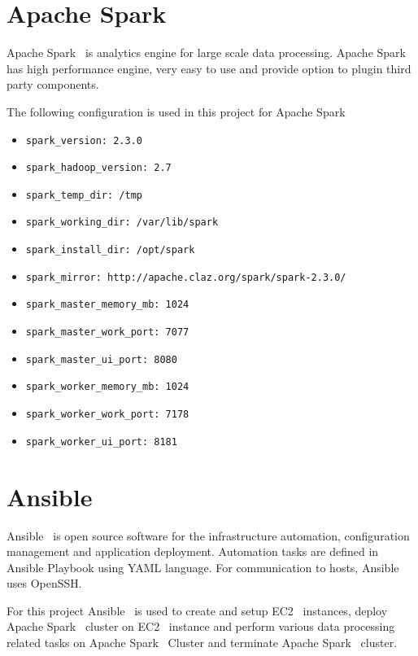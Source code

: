 \section{Apache Spark}

Apache Spark~\cite{hid-sp18-511-www-spark} is analytics engine for
large scale data processing. Apache
Spark~\cite{hid-sp18-511-www-spark} has high performance engine, very
easy to use and provide option to plugin third party components.

The following configuration is used in this project for Apache Spark

\begin{itemize}
	\item \verb|spark_version: 2.3.0|
	\item \verb|spark_hadoop_version: 2.7|
	\item \verb|spark_temp_dir: /tmp|
	\item \verb|spark_working_dir: /var/lib/spark|
	\item \verb|spark_install_dir: /opt/spark|
	\item \verb|spark_mirror: http://apache.claz.org/spark/spark-2.3.0/|
	\item \verb|spark_master_memory_mb: 1024|
	\item \verb|spark_master_work_port: 7077|
	\item \verb|spark_master_ui_port: 8080|
	\item \verb|spark_worker_memory_mb: 1024|
	\item \verb|spark_worker_work_port: 7178|
	\item \verb|spark_worker_ui_port: 8181|
\end{itemize}

\section{Ansible}

Ansible~\cite{hid-sp18-511-www-ansible} is open source software for
the infrastructure automation, configuration management and
application deployment. Automation tasks are defined in Ansible
Playbook using YAML language. For communication to hosts,
Ansible~\cite{hid-sp18-511-www-ansible} uses OpenSSH.

For this project Ansible~\cite{hid-sp18-511-www-ansible} is used to
create and setup EC2~\cite{hid-sp18-511-www-ec2} instances, deploy
Apache Spark~\cite{hid-sp18-511-www-spark} cluster on
EC2~\cite{hid-sp18-511-www-ec2} instance and perform various data
processing related tasks on Apache Spark~\cite{hid-sp18-511-www-spark}
Cluster and terminate Apache Spark~\cite{hid-sp18-511-www-spark} cluster.

